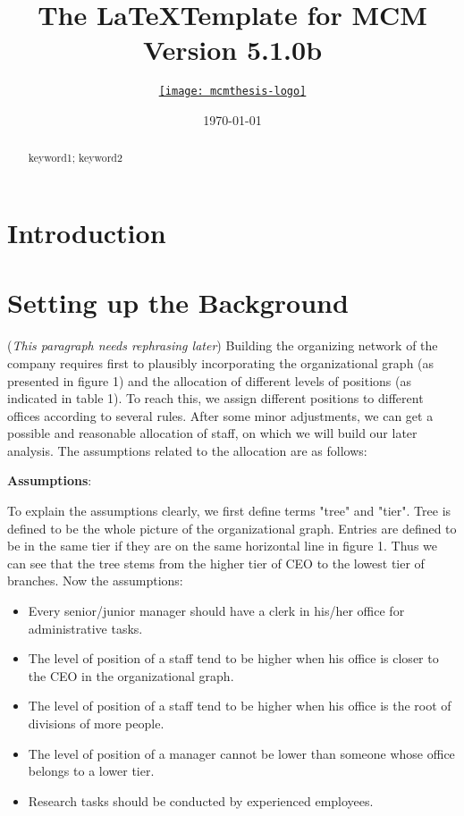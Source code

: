 \documentclass[tcn = 37075, sheet = true, abstract = true]{mcmthesis}
\title{The \LaTeX Template for MCM Version 5.1.0b}
\author{\small \href{http://www.latexstudio.net/}
  {\texttt{[image: mcmthesis-logo]}}}
\date{\today}
\begin{document}
\begin{abstract}
\lipsum[1]
\begin{keywords}
keyword1; keyword2
\end{keywords}
\end{abstract}
\maketitle
\newpage
\section{Introduction}

\section{Setting up the Background}

(\textit{This paragraph needs rephrasing later}) Building the organizing network of the company requires first to plausibly incorporating the organizational graph (as presented in figure 1) and the allocation of different levels of positions (as indicated in table 1). To reach this, we assign different positions to different offices according to several rules. After some minor adjustments, we can get a possible and reasonable allocation of staff, on which we will build our later analysis. The assumptions related to the allocation are as follows:

\noindent \textbf{Assumptions}:

To explain the assumptions clearly, we first define terms "tree" and "tier". Tree is defined to be the whole picture of the organizational graph. Entries are defined to be in the same tier if they are on the same horizontal line in figure 1. Thus we can see that the tree stems from the higher tier of CEO to the lowest tier of branches. Now the assumptions:

\begin{itemize}
\item Every senior/junior manager should have a clerk in his/her office for administrative tasks.
\item The level of position of a staff tend to be higher when his office is closer to the CEO in the organizational graph.
\item The level of position of a staff tend to be higher when his office is the root of divisions of more people.
\item The level of position of a manager cannot be lower than someone whose office belongs to a lower tier.
\item Research tasks should be conducted by experienced employees.
\end{itemize}
\end{document}

